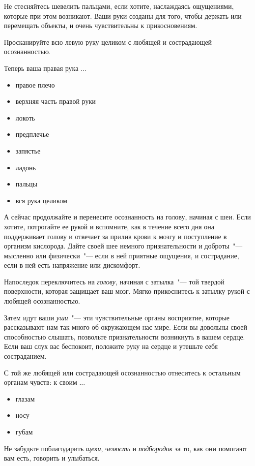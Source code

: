 \begin{itemize}
	\itemdiamondsuit Не стесняйтесь шевелить пальцами, если хотите, наслаждаясь ощущениями, которые при этом возникают. Ваши руки созданы для того, чтобы держать или перемещать объекты, и очень чувствительны к прикосновениям.
	
	\itemdiamondsuit Просканируйте всю левую руку целиком с любящей и сострадающей осознанностью.
	
	\itemdiamondsuit Теперь ваша правая рука ...
	\begin{itemize}
		\item правое плечо
		\item верхняя часть правой руки
		\item локоть
		\item предплечье
		\item запястье
		\item ладонь
		\item пальцы
		\item вся рука целиком	
	\end{itemize}
	
	\itemdiamondsuit А сейчас продолжайте и перенесите осознанность на голову, начиная с шеи. Если хотите, потрогайте ее рукой и вспомните, как в течение всего дня она поддерживает голову и отвечает за прилив крови к мозгу и поступление в организм кислорода. Дайте своей шее немного признательности и доброты~"--- мысленно или  физически~"--- если в ней приятные ощущения, и сострадание, если в ней есть напряжение или дискомфорт.
	
	\itemdiamondsuit Напоследок переключитесь на \emph{голову}, начиная с затылка~"--- той твердой поверхности, которая защищает ваш мозг. Мягко прикоснитесь к затылку рукой с любящей осознанностью.
	
	\itemdiamondsuit Затем идут ваши \emph{уши}~"--- эти чувствительные органы восприятие, которые рассказывают нам так много об окружающем нас мире. Если вы довольны своей способностью слышать, позвольте признательности возникнуть в вашем сердце. Если ваш слух вас беспокоит, положите руку на сердце и утешьте себя состраданием.
	
	\itemdiamondsuit С той же любящей или сострадающей осознанностью отнеситесь к остальным органам чувств: к своим ...
	\begin{itemize}
		\item глазам
		\item носу
		\item губам 	
	\end{itemize}
	
	\itemdiamondsuit Не забудьте поблагодарить \emph{щеки}, \emph{челюсть} и \emph{подбородок} за то, как они помогают вам есть, говорить и улыбаться.
	

\end{itemize}
